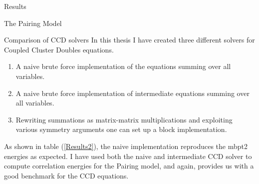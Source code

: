 \documentclass[twoside,english]{uiofysmaster}
\begin{document}
\begin{chapter}{Results}
\begin{section}{The Pairing Model}
		\begin{subsection}{Comparison of CCD solvers}
			In this thesis I have created three different solvers for Coupled Cluster Doubles equations. 
			\begin{enumerate}
				\item A naive brute force implementation of the equations summing over all variables. 
				\item A naive brute force implementation of intermediate equations summing over all variables.
				\item Rewriting summations as matrix-matrix multiplications and exploiting various symmetry arguments one can set up a block implementation.
			\end{enumerate}		
			As shown in table (\ref{Results2}), the naive implementation reproduces the mbpt2 energies as expected. I have used both the naive and intermediate CCD solver to compute correlation energies for the Pairing model, and again, \cite{Hjorth-Jensen2016} provides us with a good benchmark for the CCD equations.


\end{subsection}
\end{section}
\end{chapter}
\end{document}
